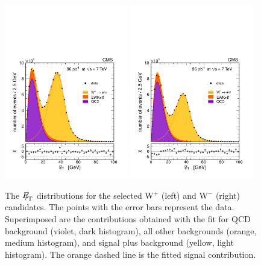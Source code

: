 \begin{figure}[htbp]
\begin{center}
\includegraphics[width=0.48\textwidth]{figs/wp_36pb.pdf}
\includegraphics[width=0.48\textwidth]{figs/wm_36pb.pdf}
\caption{ \label{fig:WenPM}
The ${E\!\!\!/}_{\!\mathrm{T}}$ distributions for the selected W$^+$ (left) and W$^-$ (right) candidates.
The points with the error bars represent the data. Superimposed are the contributions
obtained with the fit for QCD background (violet, dark histogram), all other backgrounds
(orange, medium histogram), and signal plus background (yellow, light histogram).
The orange dashed line is the fitted signal contribution.
}
\end{center}
\end{figure}

